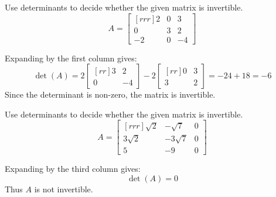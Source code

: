 \ii Use determinants to decide whether the given matrix is invertible.\\
$$ A =
\begin{bmatrix}[rrr]
2&0&3\\
0&3&2\\
-2&0&-4
\end{bmatrix}
$$
\begin{solution}Expanding by the first column gives:\\
$$
\det(A) = 2
\begin{bmatrix}[rr]
3&2\\
0&-4
\end{bmatrix}
-2
\begin{bmatrix}[rr]
0&3\\
3&2
\end{bmatrix}
=-24 + 18 =-6
$$
Since the determinant is non-zero, the matrix is invertible.
\end{solution}

\ii Use determinants to decide whether the given matrix is invertible.\\
$$ A =
\begin{bmatrix}[rrr]
\sqrt{2}&-\sqrt{7}&0\\
3\sqrt{2}&-3\sqrt{7}&0\\
5&-9&0
\end{bmatrix}
$$
\begin{solution}Expanding by the third column gives:\\
$$
\det(A) = 0
$$
Thus $A$ is not invertible.
\end{solution}

